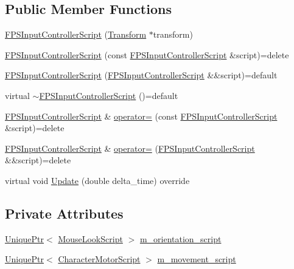 \subsection*{Public Member Functions}
\begin{DoxyCompactItemize}
\item 
\hyperlink{classmage_1_1_f_p_s_input_controller_script_a262c5e01549b86bdb7eb25be0da26413}{F\+P\+S\+Input\+Controller\+Script} (\hyperlink{structmage_1_1_transform}{Transform} $\ast$transform)
\item 
\hyperlink{classmage_1_1_f_p_s_input_controller_script_ad47bd24645ec8a7b08c3048c92ed56fd}{F\+P\+S\+Input\+Controller\+Script} (const \hyperlink{classmage_1_1_f_p_s_input_controller_script}{F\+P\+S\+Input\+Controller\+Script} \&script)=delete
\item 
\hyperlink{classmage_1_1_f_p_s_input_controller_script_acab23879d93819b2d4ccf98c16403c36}{F\+P\+S\+Input\+Controller\+Script} (\hyperlink{classmage_1_1_f_p_s_input_controller_script}{F\+P\+S\+Input\+Controller\+Script} \&\&script)=default
\item 
virtual \hyperlink{classmage_1_1_f_p_s_input_controller_script_af01f839ac9e214003de70732988de247}{$\sim$\+F\+P\+S\+Input\+Controller\+Script} ()=default
\item 
\hyperlink{classmage_1_1_f_p_s_input_controller_script}{F\+P\+S\+Input\+Controller\+Script} \& \hyperlink{classmage_1_1_f_p_s_input_controller_script_a226a1fb2eecbd7ecdf2033a8f5460e8b}{operator=} (const \hyperlink{classmage_1_1_f_p_s_input_controller_script}{F\+P\+S\+Input\+Controller\+Script} \&script)=delete
\item 
\hyperlink{classmage_1_1_f_p_s_input_controller_script}{F\+P\+S\+Input\+Controller\+Script} \& \hyperlink{classmage_1_1_f_p_s_input_controller_script_adac34abea3d474bf8183c2555dde9034}{operator=} (\hyperlink{classmage_1_1_f_p_s_input_controller_script}{F\+P\+S\+Input\+Controller\+Script} \&\&script)=delete
\item 
virtual void \hyperlink{classmage_1_1_f_p_s_input_controller_script_ab78955a67341970a41b21ae943b81585}{Update} (double delta\+\_\+time) override
\end{DoxyCompactItemize}
\subsection*{Private Attributes}
\begin{DoxyCompactItemize}
\item 
\hyperlink{namespacemage_a8c307fbcc33bce9b7f2aa4c26c3b95cf}{Unique\+Ptr}$<$ \hyperlink{classmage_1_1_mouse_look_script}{Mouse\+Look\+Script} $>$ \hyperlink{classmage_1_1_f_p_s_input_controller_script_a22d47829d2bf8ef73d20e531b3be4165}{m\+\_\+orientation\+\_\+script}
\item 
\hyperlink{namespacemage_a8c307fbcc33bce9b7f2aa4c26c3b95cf}{Unique\+Ptr}$<$ \hyperlink{classmage_1_1_character_motor_script}{Character\+Motor\+Script} $>$ \hyperlink{classmage_1_1_f_p_s_input_controller_script_adef81e743004c4c182ceb71f9bc35ab6}{m\+\_\+movement\+\_\+script}
\end{DoxyCompactItemize}
